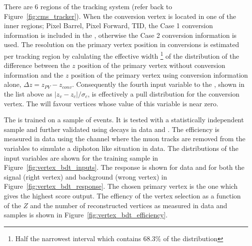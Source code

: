 There are 6 regions of the tracking system (refer back to Figure~\ref{fig:cms_tracker}). When the conversion vertex is located in one of the inner regions; Pixel Barrel, Pixel Forward, TID, the Case 1 
conversion information is included in the \BDT, otherwise the Case 2 conversion information is used. The resolution on the primary vertex position in conversions is estimated per tracking region by calulating the effective width \footnote{Half the narrowest interval which contains 68.3\% of the distribution} of the distribution of the difference between the $z$ position of the primary vertex without conversion information and the $z$ position of the primary vertex using conversion information alone, $\Delta z=z_{PV}-z_{conv}$. Consequently the fourth input variable to the \BDT, shown in the list above as $|z_{v}-z_{c}|/\sigma_{c}$, is effectively a pull distribution for the conversion vertex. The \BDT will favour vertices whose value of this variable is near zero.

The \BDT is trained on a sample of \Hgg \MC events. It is tested with a statistically independent sample and further validated using \Zmumu decays in data and \MC. The efficiency is measured in data using the \Zmumu channel where the muon tracks are removed from the \BDT variables to simulate a diphoton like situation in data. The distributions of the input variables are shown for the \Hgg training sample in Figure~\ref{fig:vertex_bdt_inputs}. The \BDT response is shown for \Zmumu data and \MC for both the signal (right vertex) and background (wrong vertex) in Figure~\ref{fig:vertex_bdt_response}. The chosen primary vertex is the one which gives the highest score \BDT output. The effiency of the vertex selection as a function of the $Z$ \pT and the number of reconstructed vertices as measured in \Zmumu data and \MC samples is shown in Figure~\ref{fig:vertex_bdt_efficiency}. 

